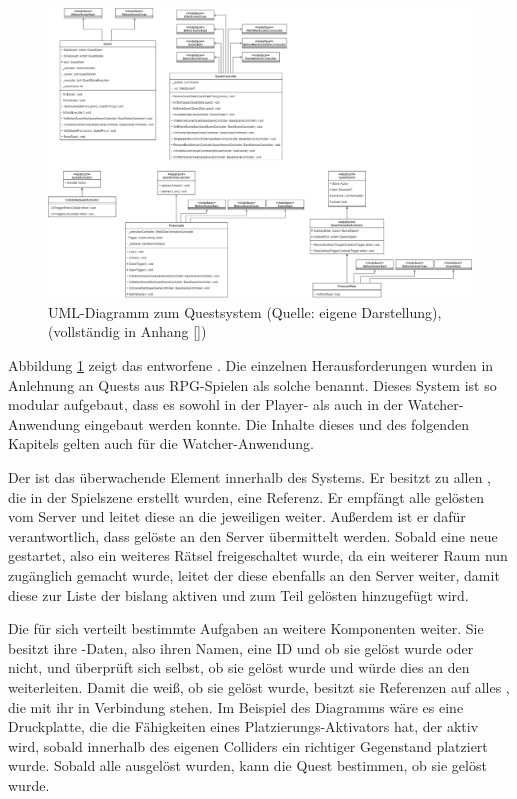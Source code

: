 \begin{figure}[ht]
\centering
\includegraphics[width=1\linewidth]{content/pictures/QuestSystem.drawio.png}
\caption{UML-Diagramm zum Questsystem (Quelle: eigene Darstellung), (vollständig in Anhang \ref{})}
\label{fig:quest-system-uml}
\end{figure}

Abbildung \ref{fig:quest-system-uml} zeigt das entworfene . Die einzelnen Herausforderungen wurden in Anlehnung an Quests aus \ac{RPG}-Spielen als solche benannt. Dieses System ist so modular aufgebaut, dass es sowohl in der Player- als auch in der Watcher-Anwendung eingebaut werden konnte. Die Inhalte dieses und des folgenden Kapitels gelten auch für die Watcher-Anwendung.

Der  ist das überwachende Element innerhalb des Systems. Er besitzt zu allen , die in der Spielszene erstellt wurden, eine Referenz. Er empfängt alle gelösten  vom Server und leitet diese an die jeweiligen  weiter. Außerdem ist er dafür verantwortlich, dass gelöste  an den Server übermittelt werden. Sobald eine neue  gestartet, also ein weiteres Rätsel freigeschaltet wurde, da ein weiterer Raum nun zugänglich gemacht wurde, leitet der  diese ebenfalls an den Server weiter, damit diese zur Liste der bislang aktiven und zum Teil gelösten  hinzugefügt wird.

Die  für sich verteilt bestimmte Aufgaben an weitere Komponenten weiter. Sie besitzt ihre -Daten, also ihren Namen, eine ID und ob sie gelöst wurde oder nicht, und überprüft sich selbst, ob sie gelöst wurde und würde dies an den  weiterleiten. Damit die  weiß, ob sie gelöst wurde, besitzt sie Referenzen auf alles , die mit ihr in Verbindung stehen. Im Beispiel des Diagramms wäre es eine Druckplatte, die die Fähigkeiten eines Platzierungs-Aktivators hat, der aktiv wird, sobald innerhalb des eigenen Colliders ein richtiger Gegenstand platziert wurde. Sobald alle  ausgelöst wurden, kann die Quest bestimmen, ob sie gelöst wurde. 

